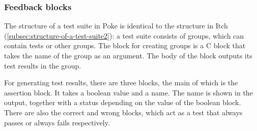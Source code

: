 \documentclass[../main]{subfiles}
\begin{document}
\subsubsection{Feedback blocks}

\begin{scratch}[scale=0.6]
\end{scratch}

The structure of a test suite in Poke is identical to the structure in Itch (\cref{subsec:structure-of-a-test-suite2}): a test suite consists of groups, which can contain tests or other groups.
The block for creating groups is a C block that takes the name of the group as an argument.
The body of the block outputs its test results in the group.

\begin{wide}
    \begin{varwidth}{0.40\linewidth}
        \begin{scratch}[scale=0.6]
        \end{scratch}
    \end{varwidth}%
    \hspace{1em}%
    \begin{varwidth}{0.28\linewidth}
        \begin{scratch}[scale=0.6]
        \end{scratch}
    \end{varwidth}%
    \hspace{1em}%
    \begin{varwidth}{0.25\linewidth}
        \begin{scratch}[scale=0.6]
        \end{scratch}
    \end{varwidth}
\end{wide}

For generating test results, there are three blocks, the main of which is the assertion block.
It takes a boolean value and a name.
The name is shown in the output, together with a status depending on the value of the boolean block.
There are also the correct and wrong blocks, which act as a test that always passes or always fails respectively.
\end{document}
